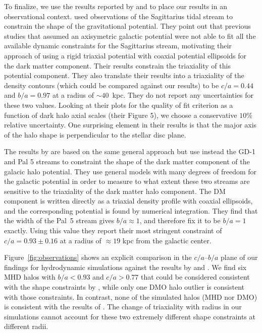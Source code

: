 \documentclass[usenatbib]{mnras}
\begin{document}
To finalize, we use the results reported by \cite{LM10} and \cite{Bovy16}
to place our results in an observational context.
\cite{LM10} used observations of the Sagittarius tidal stream to
constrain the shape of the gravitational potential.
They point out that previous studies that assumed an
axisymetric galactic potential were not able to fit all the available
dynamic constraints for the Sagittarius stream, motivating 
their approach of using a rigid triaxial potential with coaxial potential
ellipsoids for the dark matter component.  
Their results constrain the triaxiality of this potential
component.  They also translate their results into a triaxiality of the density
contours (which could be compared against our results)
 to be $c/a=0.44$ and $b/a=0.97$ at a radius of $\sim 40$~kpc. 
They do not report any uncertainties for these two values. 
Looking at their plots for the quality of fit criterion as a function
of dark halo axial scales (their Figure 5), we choose a conservative $10\%$
relative uncertainty. One surprising element in their results is that 
the major axis of the
halo shape is perpendicular to the stellar disc plane.  

The results by \cite{Bovy16} are based on the same general approach but use
instead the GD-1 \citep{2006ApJ...641L..37G} and Pal 5 \citep{2009AJ....137.3378O}
streams to constraint the shape of the dark matter component of the
galacic halo potential. They use general models with many degrees of freedom for the galactic
potential in order to measure to what extent these two streams are sensitive
to the triaxiality of the dark matter halo component.
The DM component is written directly as a triaxial density profile
with coaxial ellipsoids, and the corresponding potential is found by
numerical integration. They find that the width of the Pal~5 stream gives $b/a\approx
1$, and therefore fix it to be $b/a=1$ exactly. Using this value they report their 
most stringent constraint of $c/a=0.93\pm0.16$ at a radius of $\approx 19$ kpc from the galactic
center. 

Figure~\ref{fig:observations} shows an explicit comparison in
the $c/a$--$b/a$ plane of our findings for hydrodynamic simulations against the
results by \cite{LM10} and \cite{Bovy16}.
We find six MHD halos with $b/a<0.93$ and $c/a>0.77$ that could be
considered consistent with the shape constraints  by \citet{Bovy16}, while
only one DMO halo outlier  is consistent with those constraints.
In contrast, none of the simulated halos (MHD nor DMO) is consistent
with the results of \citet{LM10}. The change of triaxiality with radius in 
our simulations cannot account for these two extremely different 
shape constraints at different radii. 
\end{document}
